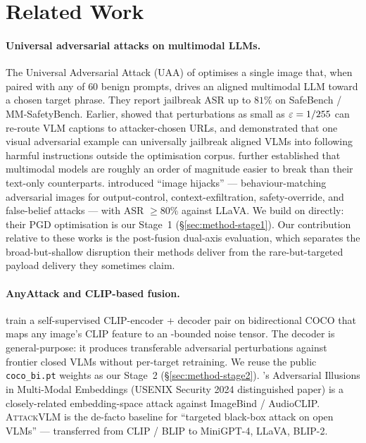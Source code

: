\section{Related Work}
\label{sec:related}

\paragraph{Universal adversarial attacks on multimodal LLMs.}
The Universal Adversarial Attack (UAA) of \citet{rahmatullaev2025universal} optimises a single image that, when paired with any of $60$ benign prompts, drives an aligned multimodal LLM toward a chosen target phrase. They report jailbreak ASR up to $81\%$ on SafeBench / MM-SafetyBench. Earlier, \citet{schlarmann2023robustness} showed that perturbations as small as $\varepsilon=1/255$ can re-route VLM captions to attacker-chosen URLs, and \citet{qi2024visual} demonstrated that one visual adversarial example can universally jailbreak aligned VLMs into following harmful instructions outside the optimisation corpus. \citet{carlini2024aligned} further established that multimodal models are roughly an order of magnitude easier to break than their text-only counterparts. \citet{bailey2024image} introduced ``image hijacks'' --- behaviour-matching adversarial images for output-control, context-exfiltration, safety-override, and false-belief attacks --- with ASR $\geq 80\%$ against LLaVA. We build on \citet{rahmatullaev2025universal} directly: their PGD optimisation is our Stage~1 (\S\ref{sec:method-stage1}). Our contribution relative to these works is the post-fusion dual-axis evaluation, which separates the broad-but-shallow disruption their methods deliver from the rare-but-targeted payload delivery they sometimes claim.

\paragraph{AnyAttack and CLIP-based fusion.}
\citet{zhang2025anyattack} train a self-supervised CLIP-encoder + decoder pair on bidirectional COCO that maps any image's CLIP feature to an \Linf{}-bounded noise tensor. The decoder is general-purpose: it produces transferable adversarial perturbations against frontier closed VLMs without per-target retraining. We reuse the public \texttt{coco\_bi.pt} weights as our Stage~2 (\S\ref{sec:method-stage2}). \citet{zhang2024adversarial}'s Adversarial Illusions in Multi-Modal Embeddings (USENIX Security 2024 distinguished paper) is a closely-related embedding-space attack against ImageBind / AudioCLIP. \textsc{AttackVLM} \citep{zhao2023attackvlm} is the de-facto baseline for ``targeted black-box attack on open VLMs'' --- transferred from CLIP / BLIP to MiniGPT-4, LLaVA, BLIP-2.

